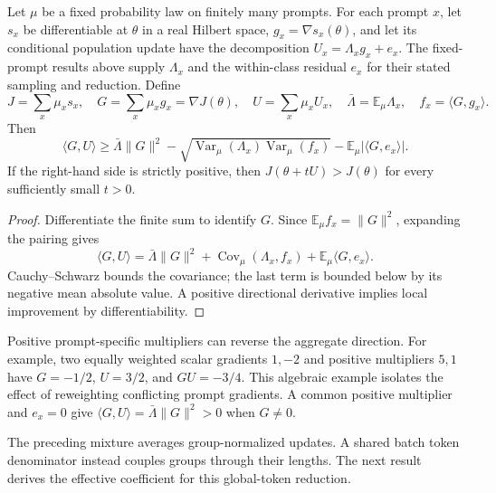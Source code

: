 \begin{corollary}
\label{cor:prompt-ascent}
Let $\mu$ be a fixed probability law on finitely many prompts. For each
prompt $x$, let $s_x$ be differentiable at $\theta$ in a real Hilbert space,
$g_x=\nabla s_x(\theta)$, and let its conditional population update have
the decomposition $U_x=\Lambda_x g_x+e_x$. The fixed-prompt results above
supply $\Lambda_x$ and the within-class residual $e_x$ for their stated
sampling and reduction. Define
\[
 J=\sum_x\mu_xs_x,\quad G=\sum_x\mu_xg_x=\nabla J(\theta),\quad
 U=\sum_x\mu_xU_x,\quad \bar\Lambda=\mathbb E_\mu\Lambda_x,
 \quad f_x=\langle G,g_x\rangle.
\]
Then
\begin{equation}
 \langle G,U\rangle\ge
 \bar\Lambda\|G\|^2-
 \sqrt{\operatorname{Var}_\mu(\Lambda_x)\operatorname{Var}_\mu(f_x)}
 -\mathbb E_\mu|\langle G,e_x\rangle|.
 \label{eq:prompt-ascent}
\end{equation}
If the right-hand side is strictly positive, then
$J(\theta+tU)>J(\theta)$ for every sufficiently small $t>0$.
\end{corollary}
\begin{proof}
Differentiate the finite sum to identify $G$. Since
$\mathbb E_\mu f_x=\|G\|^2$, expanding the pairing gives
\[
 \langle G,U\rangle=\bar\Lambda\|G\|^2+
 \operatorname{Cov}_\mu(\Lambda_x,f_x)+
 \mathbb E_\mu\langle G,e_x\rangle.
\]
Cauchy--Schwarz bounds the covariance; the last term is bounded below
by its negative mean absolute value. A positive directional derivative
implies local improvement by differentiability.
\end{proof}

Positive prompt-specific multipliers can reverse the aggregate direction.
For example, two equally weighted scalar gradients $1,-2$
and positive multipliers $5,1$ have $G=-1/2$, $U=3/2$, and
$GU=-3/4$. This algebraic example isolates the effect of reweighting conflicting
prompt gradients.
A common positive multiplier and $e_x=0$ give
$\langle G,U\rangle=\bar\Lambda\|G\|^2>0$ when $G\ne0$.

The preceding mixture averages group-normalized updates. A shared batch
token denominator instead couples groups through their lengths. The next
result derives the effective coefficient for this global-token reduction.

